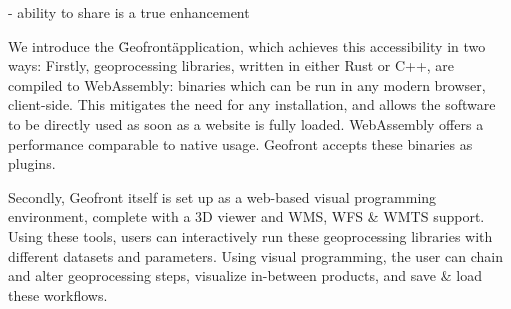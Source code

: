 - ability to share is a true enhancement



We introduce the \"Geofront\" application, which achieves this accessibility in two ways: 
Firstly, geoprocessing libraries, written in either Rust or C++, are compiled to WebAssembly: binaries which can be run in any modern browser, client-side. This mitigates the need for any installation, and allows the software to be directly used as soon as a website is fully loaded. WebAssembly offers a performance comparable to native usage. Geofront accepts these binaries as plugins.

Secondly, Geofront itself is set up as a web-based visual programming environment, complete with a 3D viewer and WMS, WFS \& WMTS support. Using these tools, users can interactively run these geoprocessing libraries with different datasets and parameters. Using visual programming, the user can chain and alter geoprocessing steps, visualize in-between products, and save \& load these workflows.












